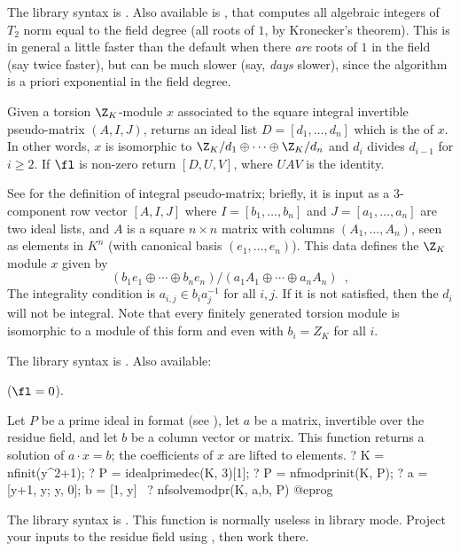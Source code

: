 The library syntax is .
Also available is , that computes
all algebraic integers of $T_2$ norm equal to the field degree
(all roots of $1$, by Kronecker's theorem). This is in general a little
faster than the default when there \emph{are} roots of $1$ in the field
(say twice faster), but can be much slower (say, \emph{days} slower), since
the algorithm is a priori exponential in the field degree.

\label{se:nfsnf}
Given a torsion $\Z_K$-module $x$ associated to the square integral
invertible pseudo-matrix $(A,I,J)$, returns an ideal list
$D=[d_1,\dots,d_n]$ which is the  of $x$. In other
words, $x$ is isomorphic to $\Z_K/d_1\oplus\cdots\oplus\Z_K/d_n$ and $d_i$
divides $d_{i-1}$ for $i\ge2$. If $\fl$ is non-zero return $[D,U,V]$, where
$UAV$ is the identity.

See  for the definition of integral pseudo-matrix;
briefly, it is input as a 3-component row vector $[A,I,J]$ where
$I = [b_1,\dots,b_n]$ and $J = [a_1,\dots,a_n]$ are two ideal lists,
and $A$ is a square $n\times n$ matrix with columns $(A_1,\dots,A_n)$,
seen as elements in $K^n$ (with canonical basis $(e_1,\dots,e_n)$).
This data defines the $\Z_K$ module $x$ given by
$$ (b_1e_1\oplus\cdots\oplus b_ne_n) / (a_1A_1\oplus\cdots\oplus a_nA_n)
\enspace, $$
The integrality condition is $a_{i,j} \in b_i a_j^{-1}$ for all $i,j$. If it
is not satisfied, then the $d_i$ will not be integral. Note that every
finitely generated torsion module is isomorphic to a module of this form and
even with $b_i=Z_K$ for all $i$.

The library syntax is .
Also available:

 ($\fl = 0$).

\label{se:nfsolvemodpr}
Let $P$ be a prime ideal in  format (see ),
let $a$ be a matrix, invertible over the residue field, and let $b$ be
a column vector or matrix. This function returns a solution of $a\cdot x =
b$; the coefficients of $x$ are lifted to  elements.
\bprog
? K = nfinit(y^2+1);
? P = idealprimedec(K, 3)[1];
? P = nfmodprinit(K, P);
? a = [y+1, y; y, 0]; b = [1, y]~
? nfsolvemodpr(K, a,b, P)
@eprog

The library syntax is .
This function is normally useless in library mode. Project your
inputs to the residue field using , then work there.

